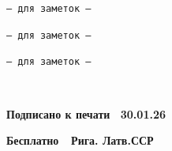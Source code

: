 \documentclass[utf8]{lgu}
\newcommand{\code}[1]{{\normalsize\texttt{#1}}}
\begin{document}
\clearpage
\thispagestyle{empty}
\begin{center}
\code{— для заметок —}
\end{center}

\clearpage
\thispagestyle{empty}
\begin{center}
\code{— для заметок —}
\end{center}

\clearpage
\thispagestyle{empty}
\begin{center}
\code{— для заметок —}
\end{center}

\clearpage
\thispagestyle{empty}
\begin{center}
~
\end{center}

\clearpage
\thispagestyle{empty}
\color{black}

\makeatletter
\vspace*{\fill}
\begin{center}%
  \hspace*{-3cm}
  \begin{minipage}{0.6\textwidth}
    \centering
    \scriptsize
    \textbf{\@author}
    
    \vspace{\baselineskip}
    \textbf{\MakeUppercase{\@nosaukumsLB}}
    
    \vspace{\baselineskip}
    \textbf{\@darbaveidsLB}
    
    \vspace{\baselineskip}
    \textbf{Подписано к печати~ 30.01.26}

    \textbf{Бесплатно\;\;\,~ Рига. Латв.\;ССР}
  \end{minipage}
\end{center}
\makeatother
\end{document}
